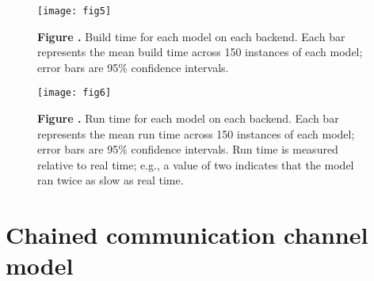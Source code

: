 \documentclass{frontiersSCNS}
\begin{document}
\begin{figure}[!ht]
\begin{center}
  \texttt{[image: fig5]}
\end{center}
\textbf{\label{fig:05} Figure .}
       {Build time for each model on each backend. Each bar represents
         the mean build time across 150 instances of each model;
         error bars are 95\% confidence intervals.}
\end{figure}

\begin{figure}[!ht]
\begin{center}
  \texttt{[image: fig6]}
\end{center}
\textbf{\label{fig:06} Figure .}
       {Run time for each model on each backend. Each bar represents
         the mean run time across 150 instances of each model;
         error bars are 95\% confidence intervals.
         Run time is measured relative to real time;
         e.g., a value of two indicates that the model ran twice as slow
         as real time.}
\end{figure}

\clearpage
\appendix

\section{Chained communication channel model}
\label{App:01}
\end{document}
